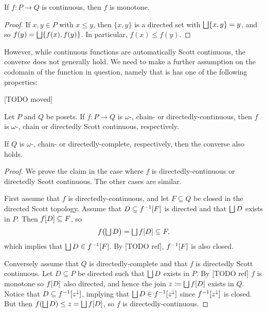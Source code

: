 \documentclass[a4paper, 11pt, article, danish, oneside]{memoir}
\DeclarePairedDelimiter{\auxdelimbracket}{[}{]}
\DeclareMathOperator*{\smallbigsqcup}{\textstyle\bigsqcup}
\DeclareMathOperator*{\bigdjoin}{\mathchoice
    {\smallbigsqcup}%
    {\bigsqcup}%
    {\bigsqcup}%
    {\bigsqcup}%
}
\newcommand{\defeq}{\coloneqq}
\newcommand{\preim}[2][]{^{-1}\auxdelimbracket[#1]{#2}}
\newcommand{\image}[2][]{\auxdelimbracket[#1]{#2}}
\begin{document}
\begin{lemma}
    If $f \colon P \to Q$ is continuous, then $f$ is monotone.
\end{lemma}

\begin{proof}
    If $x,y \in P$ with $x \leq y$, then $\{x,y\}$ is a directed set with $\bigdjoin \{x,y\} = y$, and so $f(y) = \bigdjoin \{f(x),f(y)\}$. In particular, $f(x) \leq f(y)$.
\end{proof}
%
However, while continuous functions are automatically Scott continuous, the converse does not generally hold. We need to make a further assumption on the codomain of the function in question, namely that is has one of the following properties:

[TODO moved]

\begin{proposition}
    Let $P$ and $Q$ be posets. If $f \colon P \to Q$ is $\omega$-, chain- or directedly-continuous, then $f$ is $\omega$-, chain or directedly Scott continuous, respectively.

    If $Q$ is $\omega$-, chain- or directedly-complete, respectively, then the converse also holds.
\end{proposition}

\begin{proof}
    We prove the claim in the case where $f$ is directedly-continuous or directedly Scott continuous. The other cases are similar.
    
    First assume that $f$ is directedly-continuous, and let $F \subseteq Q$ be closed in the directed Scott topology. Assume that $D \subseteq f\preim{F}$ is directed and that $\bigdjoin D$ exists in $P$. Then $f\image{D} \subseteq F$, so
    \begin{equation*}
        f \bigl( \bigdjoin D \bigr)
            = \bigdjoin f\image{D}
            \subseteq F,
    \end{equation*}
    which implies that $\bigdjoin D \in f\preim{F}$. By [TODO ref], $f\preim{F}$ is also closed.

    Conversely assume that $Q$ is directedly-complete and that $f$ is directedly Scott continuous. Let $D \subseteq P$ be directed such that $\bigdjoin D$ exists in $P$. By [TODO ref] $f$ is monotone so $f\image{D}$ also directed, and hence the join $z \defeq \bigdjoin f\image{D}$ exists in $Q$. Notice that $D \subseteq f\preim{z^\downarrow}$, implying that $\bigdjoin D \in f\preim{z^\downarrow}$ since $f\preim{z^\downarrow}$ is closed. But then $f(\bigdjoin D) \leq z = \bigdjoin f\image{D}$, so $f$ is directedly-continuous.
\end{proof}
\end{document}
